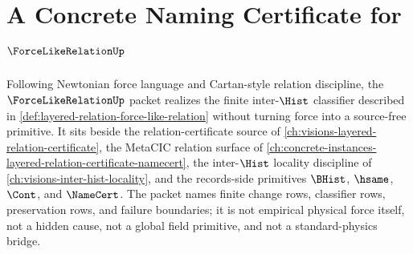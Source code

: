 \chapter{A Concrete Naming Certificate for $\ForceLikeRelationUp$}
\label{ch:concrete-instances-force-like-relation-namecert}

Following Newtonian force language and Cartan-style relation discipline, the $\ForceLikeRelationUp$ packet realizes the finite inter-$\Hist$ classifier described in \autoref{def:layered-relation-force-like-relation} without turning force into a source-free primitive. It sits beside the relation-certificate source of \autoref{ch:visions-layered-relation-certificate}, the MetaCIC relation surface of \autoref{ch:concrete-instances-layered-relation-certificate-namecert}, the inter-$\Hist$ locality discipline of \autoref{ch:visions-inter-hist-locality}, and the records-side primitives $\BHist$, $\hsame$, $\Cont$, and $\NameCert$. The packet names finite change rows, classifier rows, preservation rows, and failure boundaries; it is not empirical physical force itself, not a hidden cause, not a global field primitive, and not a standard-physics bridge.

